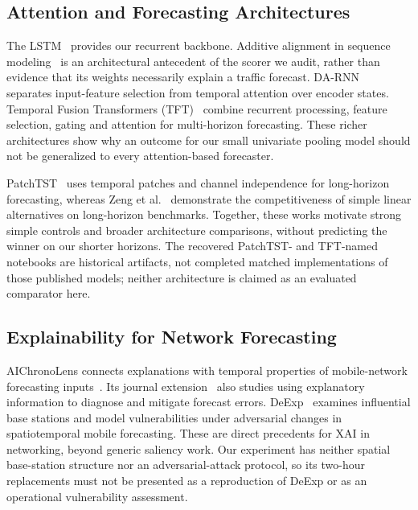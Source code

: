 \documentclass[conference]{IEEEtran}
\begin{document}
\subsection{Attention and Forecasting Architectures}
The LSTM~\cite{lstm} provides our recurrent backbone. Additive alignment in sequence modeling~\cite{bahdanau} is an architectural antecedent of the scorer we audit, rather than evidence that its weights necessarily explain a traffic forecast. DA-RNN~\cite{darnn} separates input-feature selection from temporal attention over encoder states. Temporal Fusion Transformers (TFT)~\cite{tft} combine recurrent processing, feature selection, gating and attention for multi-horizon forecasting. These richer architectures show why an outcome for our small univariate pooling model should not be generalized to every attention-based forecaster.

PatchTST~\cite{patchtst} uses temporal patches and channel independence for long-horizon forecasting, whereas Zeng et al.~\cite{linear} demonstrate the competitiveness of simple linear alternatives on long-horizon benchmarks. Together, these works motivate strong simple controls and broader architecture comparisons, without predicting the winner on our shorter horizons. The recovered PatchTST- and TFT-named notebooks are historical artifacts, not completed matched implementations of those published models; neither architecture is claimed as an evaluated comparator here.

\subsection{Explainability for Network Forecasting}
AIChronoLens connects explanations with temporal properties of mobile-network forecasting inputs~\cite{aichronolens}. Its journal extension~\cite{aichronolens_journal} also studies using explanatory information to diagnose and mitigate forecast errors. DeExp~\cite{deexp} examines influential base stations and model vulnerabilities under adversarial changes in spatiotemporal mobile forecasting. These are direct precedents for XAI in networking, beyond generic saliency work. Our experiment has neither spatial base-station structure nor an adversarial-attack protocol, so its two-hour replacements must not be presented as a reproduction of DeExp or as an operational vulnerability assessment.
\end{document}

